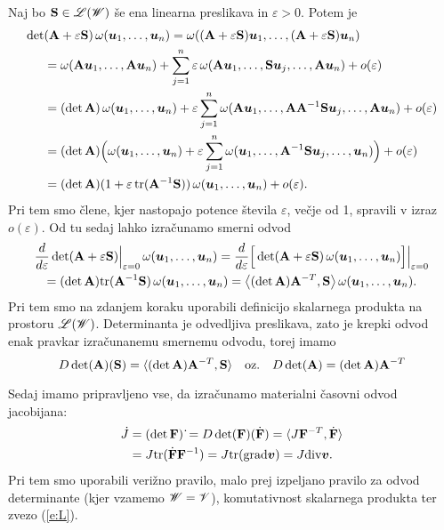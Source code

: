 Naj bo $\mathbf S\in\mathscr L(\mathscr W)$ še ena linearna preslikava in $\varepsilon>0$. Potem je
\begin{align*}
	\det&(\mathbf A+\varepsilon \mathbf S)\,\omega(\boldsymbol u_1,\dots,\boldsymbol u_n)=
	\omega((\mathbf A+\varepsilon \mathbf S)\boldsymbol u_1,\dots,(\mathbf A+\varepsilon \mathbf S)\boldsymbol u_n)\\
	&=\omega(\mathbf A\boldsymbol u_1,\dots,\mathbf A\boldsymbol u_n)+
	\sum_{j=1}^n\varepsilon\,\omega(\mathbf A\boldsymbol u_1,\dots,\mathbf S\boldsymbol u_j,\dots,\mathbf A\boldsymbol u_n)+o(\varepsilon)\\
	&=(\det \mathbf A)\,\omega(\boldsymbol u_1,\dots,\boldsymbol u_n)+\varepsilon
	\sum_{j=1}^n\omega(\mathbf A\boldsymbol u_1,\dots,\mathbf A\mathbf A^{-1}\mathbf S\boldsymbol u_j,\dots,\mathbf A\boldsymbol u_n)+o(\varepsilon)\\
	&=(\det \mathbf A)\Big(\omega(\boldsymbol u_1,\dots,\boldsymbol u_n)+\varepsilon
	\sum_{j=1}^n\omega(\boldsymbol u_1,\dots,\mathbf A^{-1}\mathbf S\boldsymbol u_j,\dots,\boldsymbol u_n)\Big)+o(\varepsilon)\\
	&=(\det \mathbf A)(1+\varepsilon\,\mathrm{tr}(\mathbf A^{-1}\mathbf S))\,\omega(\boldsymbol u_1,\dots,\boldsymbol u_n)+o(\varepsilon).
\end{align*}
Pri tem smo člene, kjer nastopajo potence števila $\varepsilon$, večje od 1, spravili
v izraz $o(\varepsilon)$. Od tu sedaj lahko izračunamo smerni odvod
\begin{multline*}
	\frac{d}{d\varepsilon}\det(\mathbf A+\varepsilon \mathbf S)\Big|_{\varepsilon=0}
	\,\omega(\boldsymbol u_1,\dots,\boldsymbol u_n)=
	\frac{d}{d\varepsilon}\Big[\det(\mathbf A+\varepsilon \mathbf S)
	\,\omega(\boldsymbol u_1,\dots,\boldsymbol u_n)\Big]\Big|_{\varepsilon=0}\\
	=(\det \mathbf A)\mathrm{tr}(\mathbf A^{-1}\mathbf S)\,\omega(\boldsymbol u_1,\dots,\boldsymbol u_n)=
	\big<(\det \mathbf A)\mathbf A^{-T}, \mathbf S\big>\,\omega(\boldsymbol u_1,\dots,\boldsymbol u_n).
\end{multline*}
Pri tem smo na zdanjem koraku uporabili definicijo skalarnega produkta na prostoru $\mathscr L(\mathscr W)$.
Determinanta je odvedljiva preslikava, zato je krepki odvod enak pravkar izračunanemu
smernemu odvodu, torej imamo
\begin{equation} \label{e:odvodet}
	D\det(\mathbf A)(\mathbf S)=\langle(\det \mathbf A)\mathbf A^{-T},\mathbf S\rangle
	\quad\textrm{oz.}\quad D\det(\mathbf A)=(\det \mathbf A)\mathbf A^{-T}
\end{equation}

Sedaj imamo pripravljeno vse, da izračunamo materialni časovni odvod jacobijana:
\begin{align}
	\dot{J}&=(\det\mathbf F)\,\dot{}=D\det(\mathbf F)(\dot{\mathbf F})=\langle J\mathbf F^{-T},\dot{\mathbf F}\rangle
	\nonumber \\ &= J\mathrm{tr}(\dot{\mathbf F}\mathbf F^{-1}) = J\mathrm{tr}(\mathrm{grad}\boldsymbol v)=J\mathrm{div}\boldsymbol v. \label{e:dotJ}
\end{align}
Pri tem smo uporabili verižno pravilo, malo prej izpeljano pravilo za odvod determinante
(kjer vzamemo $\mathscr W=\mathscr V$), komutativnost skalarnega produkta ter zvezo (\ref{e:L}).

